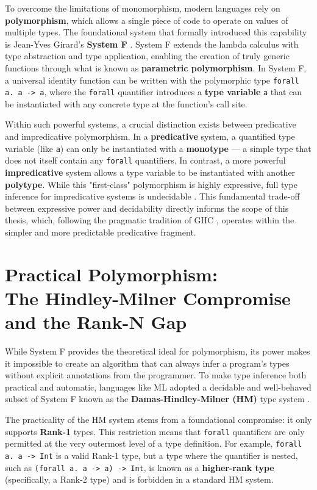 To overcome the limitations of monomorphism, modern languages rely on \textbf{polymorphism}, which allows a single piece of code to operate on values of multiple types. The foundational system that formally introduced this capability is Jean-Yves Girard's \textbf{System F} \cite{girard-system-f}. System F extends the lambda calculus with type abstraction and type application, enabling the creation of truly generic functions through what is known as \textbf{parametric polymorphism}. In System F, a universal identity function can be written with the polymorphic type \texttt{forall a. a -> a}, where the \texttt{forall} quantifier introduces a \textbf{type variable} \texttt{a} that can be instantiated with any concrete type at the function's call site.

Within such powerful systems, a crucial distinction exists between predicative and impredicative polymorphism. In a \textbf{predicative} system, a quantified type variable (like \texttt{a}) can only be instantiated with a \textbf{monotype} --- a simple type that does not itself contain any \texttt{forall} quantifiers. In contrast, a more powerful \textbf{impredicative} system allows a type variable to be instantiated with another \textbf{polytype}. While this "first-class" polymorphism is highly expressive, full type inference for impredicative systems is undecidable \cite{wells-typability-1999, serrano-quick-2020}. This fundamental trade-off between expressive power and decidability directly informs the scope of this thesis, which, following the pragmatic tradition of GHC \cite{jones-practical-2007}, operates within the simpler and more predictable predicative fragment.

\section{Practical Polymorphism: \\ The Hindley-Milner Compromise \\ and the Rank-N Gap}
\label{sec:LitReviewHM}

While System F provides the theoretical ideal for polymorphism, its power makes it impossible to create an algorithm that can always infer a program's types without explicit annotations from the programmer. To make type inference both practical and automatic, languages like ML adopted a decidable and well-behaved subset of System F known as the \textbf{Damas-Hindley-Milner (HM)} type system \cite{damas-milner}.

The practicality of the HM system stems from a foundational compromise: it only supports \textbf{Rank-1} types. This restriction means that \texttt{forall} quantifiers are only permitted at the very outermost level of a type definition. For example, \texttt{forall a. a -> Int} is a valid Rank-1 type, but a type where the quantifier is nested, such as \texttt{(forall a. a -> a) -> Int}, is known as a \textbf{higher-rank type} (specifically, a Rank-2 type) and is forbidden in a standard HM system.

